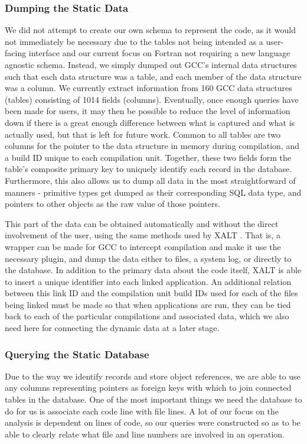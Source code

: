 \subsubsection{Dumping the Static Data}
We did not attempt to create our own schema to represent the code, as it would not immediately be necessary due to the tables not being intended as a user-facing interface and our current focus on Fortran not requiring a new language agnostic schema.
Instead, we simply dumped out \ac{GCC}'s internal data structures such that each data structure was a table, and each member of the data structure was a column.
We currently extract information from 160 \acs{GCC} data structures (tables) consisting of 1014 fields (columns).
Eventually, once enough queries have been made for users, it may then be possible to reduce the level of information down if there is a great enough difference between what is captured and what is actually used, but that is left for future work.
Common to all tables are two columns for the pointer to the data structure in memory during compilation, and a build ID unique to each compilation unit.
Together, these two fields form the table's composite primary key to uniquely identify each record in the database.
Furthermore, this also allows us to dump all data in the most straightforward of manners - primitive types get dumped as their corresponding \acs{SQL} data type, and pointers to other objects as the raw value of those pointers.

This part of the data can be obtained automatically and without the direct involvement of the user, using the same methods used by XALT \cite{7081224}.
That is, a wrapper can be made for \ac{GCC} to intercept compilation and make it use the necessary plugin, and dump the data either to files, a system log, or directly to the database.
In addition to the primary data about the code itself, XALT is able to insert a unique identifier into each linked application.
An additional relation between this link ID and the compilation unit build IDs used for each of the files being linked must be made so that when applications are run, they can be tied back to each of the particular compilations and associated data, which we also need here for connecting the dynamic data at a later stage.
\subsubsection{Querying the Static Database}
\label{sec:querying}
Due to the way we identify records and store object references, we are able to use any columns representing pointers as foreign keys with which to join connected tables in the database.
One of the most important things we need the database to do for us is associate each code line with file lines.
A lot of our focus on the analysis is dependent on lines of code, so our queries were constructed so as to be able to clearly relate what file and line numbers are involved in an operation.

